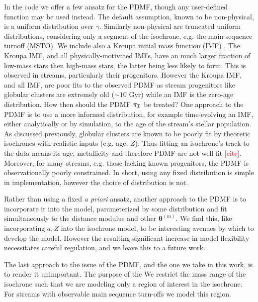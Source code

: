 \documentclass[twocolumn]{aastex631}
\newcommand{\mbs}[1]{\boldsymbol{#1}}
\newcommand{\mcal}[1]{\mathcal{#1}}
\newcommand{\prior}{\mcal{\pi}}
\newcommand{\smallcomponent}[2]{#2^{\scriptscriptstyle (#1)}}
\newcommand{\cmp}[2]{\smallcomponent{#1}{#2}}
\newcommand{\TODO}[1]{{\textcolor{red}{#1}}}
\begin{document}
            In the code we offer a few ansatz for the PDMF, though any user-defined function may be used instead. The default assumption, known to be non-physical, is a uniform distribution over $\gamma$. Similarly non-physical are truncated uniform distributions, considering only a segment of the isochrone, e.g. the main sequence turnoff (MSTO). We include also a Kroupa initial mass function (IMF) \citep{2001MNRAS.322..231K}. The Kroupa IMF, and all physically-motivated IMFs,
            have an much larger fraction of low-mass stars then high-mass stars, the latter being less likely to form. This is observed in streams, particularly their progenitors. However the Kroupa IMF, and all IMF, are poor fits to the observed PDMF as stream progenitors like globular clusters are extremely old ($\sim10$ Gyr) while an IMF is the zero-age distribution.
            How then should the PDMF $\prior_{\cal{I}}$ be treated?
            One approach to the PDMF is to use a more informed distribution, for example time-evolving an IMF, either analytically or by simulation, to the age of the stream's stellar population.
            As discussed previously, globular clusters are known to be poorly fit by theoretic isochrones with realistic inputs (e.g. age, $Z$). Thus fitting an isochrone's track to the data means its age, metallicity and therefore PDMF
            are not well fit \TODO{[cite]}. Moreover, for many streams, e.g. those lacking known progenitors, the PDMF is observationally poorly constrained.
            In short, using any fixed distribution is simple in implementation, however the choice of distribution is not.

            Rather than using a fixed \textit{a priori} ansatz, another approach to the PDMF is to incorporate it into the model,
            parameterized by some distribution and fit simultaneously to the distance modulus and other $\cmp{m}{\mbs{\theta}}$.
            We find this, like incorporating $a, Z$ into the isochrone model, to be interesting avenues by which to develop the model. However the resulting significant increase in model flexibility necessitates careful regulation,
            and we leave this to a future work.

            The last approach to the issue of the PDMF, and the one we take in this work, is to render it unimportant. The purpose of the 
            We restrict the mass range of the isochrone such that we are modeling only a region of interest in the
            isochrone. For streams with observable main sequence turn-offs we model
            this region.
\end{document}
